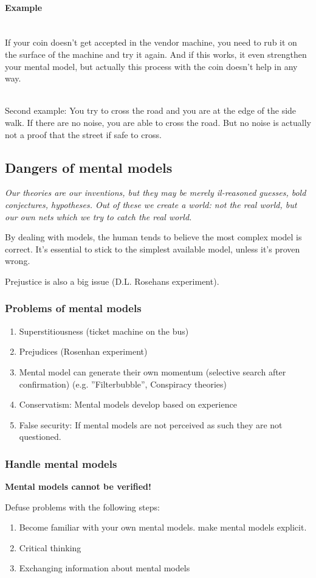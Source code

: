\paragraph{Example}\mbox{}\\
If your coin doesn't get accepted in the vendor machine, you need
to rub it on the surface of the machine and try it again. And if this
works, it even strengthen your mental model, but actually this process
with the coin doesn't help in any way.

\mbox{}\\
Second example: You try to cross the road and you are at the edge of the
side walk. If there are no noise, you are able to cross the road. But no
noise is actually not a proof that the street if safe to cross.

\subsection{Dangers of mental models}

\emph{Our theories are our inventions, but they may be merely il-reasoned
	guesses, bold conjectures, hypotheses. Out of these we create a world: not
	the real world,	but our own nets which we try to catch the real world.}

By dealing with models, the human tends to believe the most complex
model is correct. It's essential to stick to the simplest available
model, unless it's proven wrong.

Prejustice is also a big issue (D.L. Rosehans experiment).

\subsubsection{Problems of mental models}

\begin{enumerate}
\tightlist
\item Superstitiousness (ticket machine on the bus)
\item Prejudices (Rosenhan experiment)
\item Mental model can generate their own momentum (selective search after
confirmation) (e.g. ''Filterbubble'', Conspiracy theories)
\item Conservatism: Mental models develop based on experience
\item False security: If mental models are not perceived as such they are
not questioned.
\end{enumerate}

\subsubsection{Handle mental models}

\textbf{Mental models cannot be verified!}

Defuse problems with the following steps:
\begin{enumerate}
\tightlist
\item Become familiar with your own mental models.
make mental models explicit.
\item Critical thinking
\item Exchanging information about mental models
\end{enumerate}
